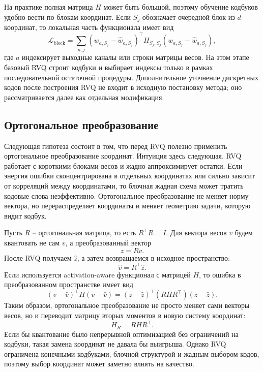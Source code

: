 \documentclass[a4paper,12pt]{article}
\begin{document}
На практике полная матрица $H$ может быть большой, поэтому обучение кодбуков удобно вести по блокам координат. Если $S_j$ обозначает очередной блок из $d$ координат, то локальная часть функционала имеет вид
\[
    \mathcal{L}_{\mathrm{block}}
    =
    \sum_{a,j}
    \left(
        w_{a,S_j} - \hat w_{a,S_j}
    \right)^\top
    H_{S_j,S_j}
    \left(
        w_{a,S_j} - \hat w_{a,S_j}
    \right),
\]
где $a$ индексирует выходные каналы или строки матрицы весов. На этом этапе базовый RVQ строит кодбуки и выбирает индексы только в рамках последовательной остаточной процедуры. Дополнительное уточнение дискретных кодов после построения RVQ не входит в исходную постановку метода; оно рассматривается далее как отдельная модификация.

\subsection{Ортогональное преобразование}

Следующая гипотеза состоит в том, что перед RVQ полезно применить ортогональное преобразование координат. Интуиция здесь следующая. RVQ работает с короткими блоками весов и жадно аппроксимирует остатки. Если энергия ошибки сконцентрирована в отдельных координатах или сильно зависит от корреляций между координатами, то блочная жадная схема может тратить кодовые слова неэффективно. Ортогональное преобразование не меняет норму вектора, но перераспределяет координаты и меняет геометрию задачи, которую видит кодбук.

Пусть $R$ -- ортогональная матрица, то есть $R^\top R = I$. Для вектора весов $v$ будем квантовать не сам $v$, а преобразованный вектор
\[
    z = Rv.
\]
После RVQ получаем $\hat z$, а затем возвращаемся в исходное пространство:
\[
    \hat v = R^\top \hat z.
\]
Если используется activation-aware функционал с матрицей $H$, то ошибка в преобразованном пространстве имеет вид
\[
    (v-\hat v)^\top H (v-\hat v)
    =
    (z-\hat z)^\top
    \left(R H R^\top\right)
    (z-\hat z).
\]
Таким образом, ортогональное преобразование не просто меняет сами векторы весов, но и переводит матрицу вторых моментов в новую систему координат:
\[
    H_R = R H R^\top.
\]
Если бы квантование было непрерывной оптимизацией без ограничений на кодбуки, такая замена координат не давала бы выигрыша. Однако RVQ ограничена конечными кодбуками, блочной структурой и жадным выбором кодов, поэтому выбор координат может заметно влиять на качество.
\end{document}
